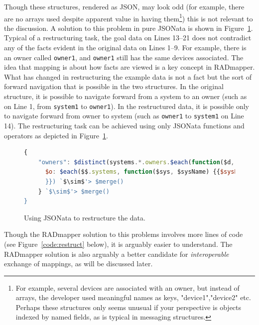 \documentclass[9pt,letterpaper]{article}
\newcommand{\stt}[1]{\texttt{#1}} %
\begin{document}
Though these structures, rendered as JSON, may look odd (for example, there are no arrays used despite apparent value in having them\footnote{For example, several devices are associated with an owner, but instead of arrays, the developer used meaningful names as keys, "device1","device2" etc. Perhaps these structures only seems unusual if your perspective is objects indexed by named fields, as is typical in messaging structures.}) this is not relevant to the discussion.
A solution to this problem in pure JSONata is shown in Figure~\ref{code:jsonata-sTPDRs}.
Typical of a restructuring task, the goal data on Lines 13--21 does not contradict any of the facts evident in the original data on Lines 1--9.
For example, there is an owner called \stt{owner1}, and \stt{owner1} still has the same devices associated.
The idea that mapping is about how facts are viewed is a key concept in RADmapper.
What has changed in restructuring the example data is not a fact but the sort of forward navigation that is possible in the two structures.
In the original structure, it is possible to navigate forward from a system to an owner (such as on Line 1, from \stt{system1} to \stt{owner1}).
In the restructured data, it is possible only to navigate forward from owner to system (such as \stt{owner1} to \stt{system1} on Line 14).
The restructuring task can be achieved using only JSONata functions and operators as depicted in Figure~\ref{code:jsonata-sTPDRs}.

\begin{figure}[H]
\caption{Using JSONata to restructure the data.}
 \label{code:jsonata-sTPDRs}
\begin{lstlisting}[language=JavaScript,basicstyle=\ttfamily\scriptsize,numberstyle=\scriptsize,escapeinside=`']
{
    "owners": $distinct(systems.*.owners.$each(function($d, $ownerName) {$ownerName}))@$o.{
      $o: $each($$.systems, function($sys, $sysName) {{$sysName: $lookup($$.systems, $sysName).owners `$\sim$'> $lookup($o)
      }}) `$\sim$'> $merge()
    } `$\sim$'> $merge()
}
\end{lstlisting}
\end{figure} \vspace{-2em}

Though the RADmapper solution to this problems involves more lines of code (see Figure~\ref{code:restruct} below), it is arguably easier to understand.
The RADmapper solution is also arguably a better candidate for \textit{interoperable} exchange of mappings, as will be discussed later.
\end{document}
